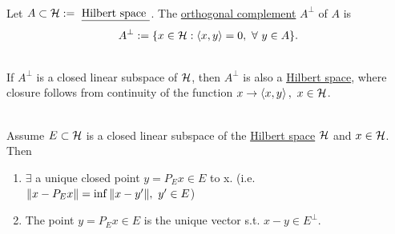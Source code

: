 \begin{definition}\ \\
Let $A \subset \mathcal{H} := \text{ \underline{Hilbert space }}$. The \underline{orthogonal complement} $A^{\perp}$ of $A$ is 
\begin{equation*}
    A^\perp := \{x \in \mathcal{H}: \left\langle x, y \right\rangle = 0,\ \forall\ y \in A\}.
\end{equation*}
\end{definition}
\begin{remark}\ \\
    If $A^\perp$ is a closed linear subspace of $\mathcal{H}$, then $A^\perp$ is also a \underline{Hilbert space}, where closure follows from continuity of the function $x \to \left\langle x, y \right\rangle,\ x \in \mathcal{H}$.
\end{remark}


\begin{theorem}\ \\
Assume $E \subset \mathcal{H}$ is a closed linear subspace of the \underline{Hilbert space} $\mathcal{H}$ and $x \in \mathcal{H}$. Then
\begin{enumerate}[label = (\alph*)]
    \item $\exists$ a unique closed point $y = P_E x \in E$ to x. (i.e. $\norm{x - P_E x} = \inf{\norm{x - y'}},\ y' \in E$)
    \item The point $y = P_E x \in E $ is the unique vector s.t. $x - y \in E^\perp$.
\end{enumerate}
\end{theorem}
